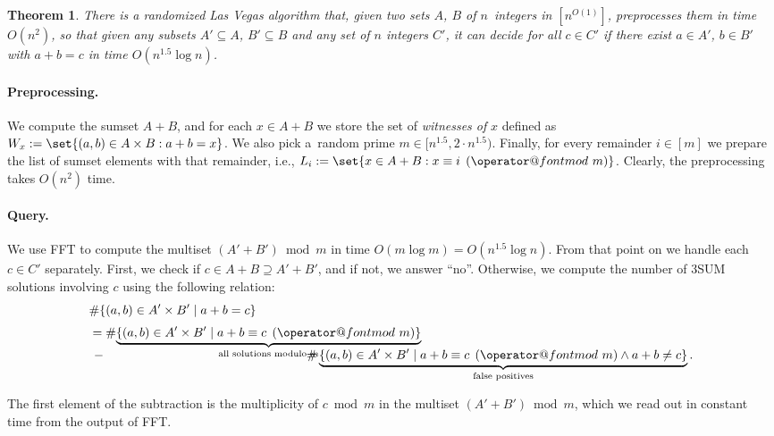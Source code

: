 \documentclass[10pt,a4paper]{article}
\makeatletter
\newtheorem{theorem}{Theorem}[section]
\newcommand{\tpmod}[1]{\mkern 8mu({\operator@font mod}\mkern 6mu#1)}
\makeatother
\begin{document}
\begin{theorem}\label{thm:unknowncrnd}
    There is a randomized Las Vegas algorithm that,
    given two sets $A$, $B$ of $n$~integers in $[n^{O(1)}]$, preprocesses them in time $O(n^2)$, so that given any subsets $A' \subseteq A$, $B' \subseteq B$ and any set of $n$ integers $C'$, it can decide for all $c \in C'$ if there exist $a \in A'$, $b \in B'$ with $a+b=c$ in time $O(n^{1.5} \log n)$.
\end{theorem}

\paragraph{Preprocessing.}
We compute the sumset $A+B$, and for each $x \in A+B$ we store the set of \emph{witnesses of} $x$ defined as $W_x := \set{ (a, b) \in A \times B : a + b = x}$. We also pick a~random prime $m \in [n^{1.5}, 2\cdot n^{1.5})$. Finally, for every remainder $i \in [m]$ we prepare the list of sumset elements with that remainder, i.e., $L_i := \set{x \in A+B : x \equiv i \tpmod{m}}$. Clearly, the preprocessing takes $O(n^2)$ time.

\paragraph{Query.}
We use FFT to compute the multiset $(A'+B') \bmod m$ in time $O(m \log m) = O(n^{1.5} \log n)$. From that point on we handle each $c \in C'$ separately. First, we check if $c \in A + B \supseteq A' + B'$, and if not, we answer ``no''. Otherwise, we compute the number of 3SUM solutions involving $c$ using the following relation:
\begin{align*}
& \# \{(a,b) \in A' \times B' \mid a+b=c\} \\[.3em]
& = \# \smash{\underbrace{\{(a,b) \in A' \times B' \mid a + b \equiv c \tpmod{m}\}}_{\text{all solutions modulo $m$}}} \\[.3em]
&\, - \hspace{16em} \# \underbrace{\{(a,b) \in A' \times B' \mid a + b \equiv c \tpmod{m} \land a + b \neq c\}}_{\text{false positives}}.
\end{align*}

The first element of the subtraction is the multiplicity of $c \bmod m$ in the multiset $(A'+B') \bmod m$, which we read out in constant time from the output of FFT.
\end{document}
